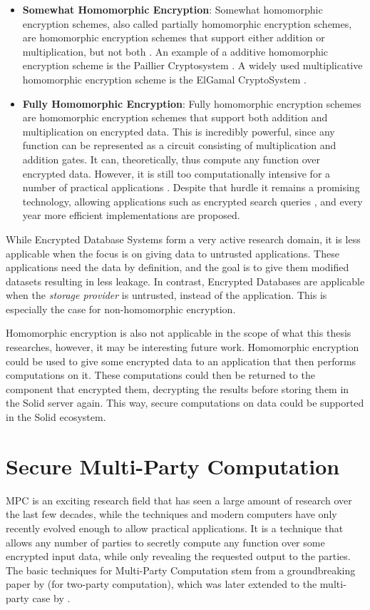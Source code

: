 \begin{itemize}
    \item \textbf{Somewhat Homomorphic Encryption}: Somewhat homomorphic encryption schemes, also called partially homomorphic encryption schemes, are homomorphic encryption schemes that support either addition or multiplication, but not both \citep{she}. An example of a additive homomorphic encryption scheme is the Paillier Cryptosystem \citep{paillier}. A widely used multiplicative homomorphic encryption scheme is the ElGamal CryptoSystem \citep{elgamal}.
    \item \textbf{Fully Homomorphic Encryption}: Fully homomorphic encryption schemes are homomorphic encryption schemes that support both addition and multiplication on encrypted data. This is incredibly powerful, since any function can be represented as a circuit consisting of multiplication and addition gates. It can, theoretically, thus compute any function over encrypted data. However, it is still too computationally intensive for a number of practical applications \citep{he-practical, pragmatic-mpc}. Despite that hurdle it remains a promising technology, allowing applications such as encrypted search queries \citep{fhe}, and every year more efficient implementations are proposed.
\end{itemize}

\noindent While Encrypted Database Systems form a very active research domain, it is less applicable when the focus is on giving data to untrusted applications. These applications need the data by definition, and the goal is to give them modified datasets resulting in less leakage. In contrast, Encrypted Databases are applicable when the \textit{storage provider} is untrusted, instead of the application. This is especially the case for non-homomorphic encryption. 

Homomorphic encryption is also not applicable in the scope of what this thesis researches, however, it may be interesting future work. Homomorphic encryption could be used to give some encrypted data to an application that then performs computations on it. These computations could then be returned to the component that encrypted them, decrypting the results before storing them in the Solid server again. This way, secure computations on data could be supported in the Solid ecosystem.

\section{Secure Multi-Party Computation}
\label{sec:mpc}
\gls{MPC} is an exciting research field that has seen a large amount of research over the last few decades, while the techniques and modern computers have only recently evolved enough to allow practical applications. It is a technique that allows any number of parties to secretly compute any function over some encrypted input data, while only revealing the requested output to the parties. The basic techniques for Multi-Party Computation stem from a groundbreaking paper by \citet{yao} (for two-party computation), which was later extended to the multi-party case by \citet{mpc}.

